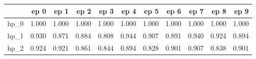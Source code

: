 \begin{tabular}{lrrrrrrrrrr}
\toprule
{} &   ep 0 &   ep 1 &   ep 2 &   ep 3 &   ep 4 &   ep 5 &   ep 6 &   ep 7 &   ep 8 &   ep 9 \\
\midrule
hp\_0 &  1.000 &  1.000 &  1.000 &  1.000 &  1.000 &  1.000 &  1.000 &  1.000 &  1.000 &  1.000 \\
hp\_1 &  0.930 &  0.871 &  0.884 &  0.808 &  0.944 &  0.907 &  0.891 &  0.940 &  0.924 &  0.894 \\
hp\_2 &  0.924 &  0.921 &  0.861 &  0.844 &  0.894 &  0.828 &  0.901 &  0.907 &  0.838 &  0.901 \\
\bottomrule
\end{tabular}
